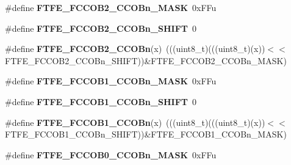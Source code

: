 \begin{DoxyCompactItemize}
\item 
\#define {\bfseries F\+T\+F\+E\+\_\+\+F\+C\+C\+O\+B2\+\_\+\+C\+C\+O\+Bn\+\_\+\+M\+A\+SK}~0x\+F\+Fu\hypertarget{group__FTFE__Register__Masks_ga87254fe5b3a8f4a9c0251e3fac167128}{}\label{group__FTFE__Register__Masks_ga87254fe5b3a8f4a9c0251e3fac167128}

\item 
\#define {\bfseries F\+T\+F\+E\+\_\+\+F\+C\+C\+O\+B2\+\_\+\+C\+C\+O\+Bn\+\_\+\+S\+H\+I\+FT}~0\hypertarget{group__FTFE__Register__Masks_ga773bf70a49a9212d4fcbf025e64955d8}{}\label{group__FTFE__Register__Masks_ga773bf70a49a9212d4fcbf025e64955d8}

\item 
\#define {\bfseries F\+T\+F\+E\+\_\+\+F\+C\+C\+O\+B2\+\_\+\+C\+C\+O\+Bn}(x)~(((uint8\+\_\+t)(((uint8\+\_\+t)(x))$<$$<$F\+T\+F\+E\+\_\+\+F\+C\+C\+O\+B2\+\_\+\+C\+C\+O\+Bn\+\_\+\+S\+H\+I\+FT))\&F\+T\+F\+E\+\_\+\+F\+C\+C\+O\+B2\+\_\+\+C\+C\+O\+Bn\+\_\+\+M\+A\+SK)\hypertarget{group__FTFE__Register__Masks_ga4ace84bb4dfe61a301135516ca61de6b}{}\label{group__FTFE__Register__Masks_ga4ace84bb4dfe61a301135516ca61de6b}

\item 
\#define {\bfseries F\+T\+F\+E\+\_\+\+F\+C\+C\+O\+B1\+\_\+\+C\+C\+O\+Bn\+\_\+\+M\+A\+SK}~0x\+F\+Fu\hypertarget{group__FTFE__Register__Masks_gaa7e9e9a1c18414790702792750daec89}{}\label{group__FTFE__Register__Masks_gaa7e9e9a1c18414790702792750daec89}

\item 
\#define {\bfseries F\+T\+F\+E\+\_\+\+F\+C\+C\+O\+B1\+\_\+\+C\+C\+O\+Bn\+\_\+\+S\+H\+I\+FT}~0\hypertarget{group__FTFE__Register__Masks_gaf6829788ff3fed81b298ec16ac8346b2}{}\label{group__FTFE__Register__Masks_gaf6829788ff3fed81b298ec16ac8346b2}

\item 
\#define {\bfseries F\+T\+F\+E\+\_\+\+F\+C\+C\+O\+B1\+\_\+\+C\+C\+O\+Bn}(x)~(((uint8\+\_\+t)(((uint8\+\_\+t)(x))$<$$<$F\+T\+F\+E\+\_\+\+F\+C\+C\+O\+B1\+\_\+\+C\+C\+O\+Bn\+\_\+\+S\+H\+I\+FT))\&F\+T\+F\+E\+\_\+\+F\+C\+C\+O\+B1\+\_\+\+C\+C\+O\+Bn\+\_\+\+M\+A\+SK)\hypertarget{group__FTFE__Register__Masks_ga74880c143b88606490751371eec37818}{}\label{group__FTFE__Register__Masks_ga74880c143b88606490751371eec37818}

\item 
\#define {\bfseries F\+T\+F\+E\+\_\+\+F\+C\+C\+O\+B0\+\_\+\+C\+C\+O\+Bn\+\_\+\+M\+A\+SK}~0x\+F\+Fu\hypertarget{group__FTFE__Register__Masks_ga7499ddf982938188b06763fed98527fa}{}\label{group__FTFE__Register__Masks_ga7499ddf982938188b06763fed98527fa}


\end{DoxyCompactItemize}
